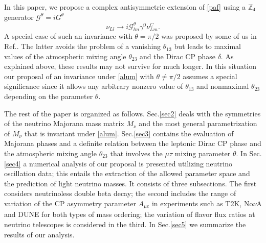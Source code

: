 \documentclass[11pt]{article}
\begin{document}
In this paper, we propose a complex antisymmetric extension of \eqref{paf} using a $\mathbb{Z}_4$ generator $\mathcal{G}^{\theta}=iG^{\theta}$
\begin{equation}
\nu_{Ll}\to i\mathcal{G}^\theta_{lm}\gamma^0\nu^C_{Lm}\label{alum}.
\end{equation} A special case of such an invariance with $\theta=\pi/2$ was proposed by some of us in Ref.\cite{Samanta:2017kce}. The latter avoids the problem of a vanishing $\theta_{13}$ but leads to maximal values of the atmospheric mixing angle $\theta_{23}$ and the Dirac CP phase $\delta$. As explained above, these results may not survive for much longer. In this situation our proposal of an invariance under \eqref{alum} with $\theta\neq\pi/2$ assumes a special significance since it allows any arbitrary nonzero value of $\theta_{13}$ and nonmaximal $\theta_{23}$ depending on the parameter $\theta$.

The rest of the paper is organized as follows. Sec.\ref{sec2} deals with the symmetries of the neutrino Majorana mass matrix $M_\nu$ and the most general parametrization of $M_\nu$ that is invariant under \eqref{alum}. Sec.\ref{sec3} contains the evaluation of Majorana phases and a definite relation between the leptonic Dirac CP phase and the atmospheric mixing angle $\theta_{23}$ that involves the $\mu\tau$ mixing parameter $\theta$. In Sec.\ref{sec4} a numerical analysis of our proposal is presented utilizing neutrino oscillation data; this entails the extraction of the allowed parameter space and the prediction of light neutrino masses. It consists of three subsections. The first considers neutrinoless double beta decay; the second includes the range of variation of the CP asymmetry parameter $A_{\mu e}$ in experiments such as T2K, No$\nu$A and DUNE for both types of mass ordering; the variation of flavor flux ratios at neutrino telescopes is considered in the third. In Sec.\ref{sec5} we summarize the results of our analysis.
\end{document}

